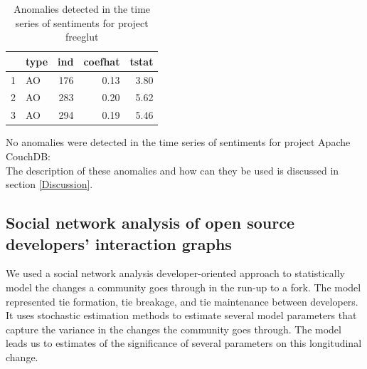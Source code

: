 \documentclass[12pt]{report}
\begin{document}
\begin{table}
\centering
\caption{Anomalies detected in the time series of sentiments for project freeglut}
\begin{tabular}{rlrrr}
  \hline
 & type & ind & coefhat & tstat \\ 
  \hline
1 & AO & 176 & 0.13 & 3.80 \\ 
  2 & AO & 283 & 0.20 & 5.62 \\ 
  3 & AO & 294 & 0.19 & 5.46 \\ 
   \hline
\end{tabular}
\end{table}


%
%

No anomalies were detected in the time series of sentiments for project Apache CouchDB: \\

The description of these anomalies and how can they be used is discussed in section \ref{Discussion}.

\pagebreak

\subsection{Social network analysis of open source developers’ interaction graphs}

We used a social network analysis developer-oriented approach to statistically model the changes a community goes through in the run-up to a fork. The model represented tie formation, tie breakage, and tie maintenance between developers. It uses stochastic estimation methods to estimate several model parameters that capture the variance in the changes the community goes through. The model leads us to estimates of the significance of several parameters on this longitudinal change.
\end{document}
